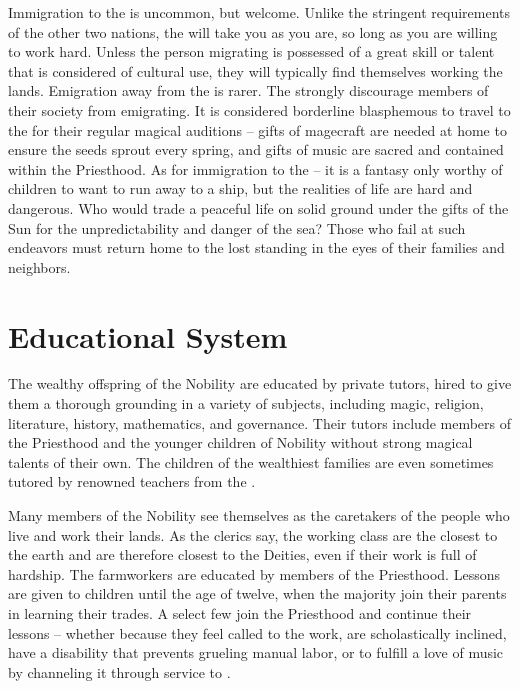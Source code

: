 \documentclass[blue]{GL2020}
\begin{document}
Immigration to the \pFarm{} is uncommon, but welcome.  Unlike the stringent requirements of the other two nations, the \pFarm{} will take you as you are, so long as you are willing to work hard.  Unless the person migrating is possessed of a great skill or talent that is considered of cultural use, they will typically find themselves working the lands.  Emigration away from the \pFarm{} is rarer.  The \pFarmers{} strongly discourage members of their society from emigrating. It is considered borderline blasphemous to travel to the \pTech{} for their regular magical auditions -- gifts of magecraft are needed at home to ensure the seeds sprout every spring, and gifts of music are sacred and contained within the Priesthood.  As for immigration to the \pShip{} -- it is a fantasy only worthy of children to want to run away to a \pShippie{} ship, but the realities of \pShip{} life are hard and dangerous. Who would trade a peaceful life on solid ground under the gifts of the Sun for the unpredictability and danger of the sea?  Those who fail at such endeavors must return home to the lost standing in the eyes of their families and neighbors.

\section*{Educational System}
The wealthy offspring of the Nobility are educated by private tutors, hired to give them a thorough grounding in a variety of subjects, including magic, religion, literature, history, mathematics, and governance.  Their tutors include members of the Priesthood and the younger children of Nobility without strong magical talents of their own.  The children of the wealthiest families are even sometimes tutored by renowned teachers from the \pTech{}.

Many members of the Nobility see themselves as the caretakers of the people who live and work their lands.  As the clerics say, the working class are the closest to the earth and are therefore closest to the Deities, even if their work is full of hardship.  The farmworkers are educated by members of the Priesthood.  Lessons are given to children until the age of twelve, when the majority join their parents in learning their trades.  A select few join the Priesthood and continue their lessons -- whether because they feel called to the work, are scholastically inclined, have a disability that prevents grueling manual labor, or to fulfill a love of music by channeling it through service to \cFarmGod{}.
\end{document}

